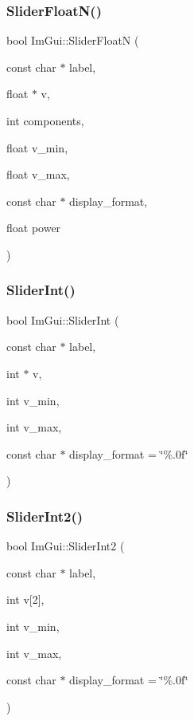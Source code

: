 \hypertarget{namespace_im_gui_a3ffffbdfe59f18a2321dd1cb39dfb6e1}{}\label{namespace_im_gui_a3ffffbdfe59f18a2321dd1cb39dfb6e1} 
\subsubsection{\texorpdfstring{Slider\+Float\+N()}{SliderFloatN()}}
{\footnotesize\ttfamily bool Im\+Gui\+::\+Slider\+FloatN (\begin{DoxyParamCaption}\item[{const char $\ast$}]{label,  }\item[{float $\ast$}]{v,  }\item[{int}]{components,  }\item[{float}]{v\+\_\+min,  }\item[{float}]{v\+\_\+max,  }\item[{const char $\ast$}]{display\+\_\+format,  }\item[{float}]{power }\end{DoxyParamCaption})}

\hypertarget{namespace_im_gui_adfa3869210878bbf2c92c3c9383534f5}{}\label{namespace_im_gui_adfa3869210878bbf2c92c3c9383534f5} 
\subsubsection{\texorpdfstring{Slider\+Int()}{SliderInt()}}
{\footnotesize\ttfamily bool Im\+Gui\+::\+Slider\+Int (\begin{DoxyParamCaption}\item[{const char $\ast$}]{label,  }\item[{int $\ast$}]{v,  }\item[{int}]{v\+\_\+min,  }\item[{int}]{v\+\_\+max,  }\item[{const char $\ast$}]{display\+\_\+format = {\ttfamily \char`\"{}\%.0f\char`\"{}} }\end{DoxyParamCaption})}

\hypertarget{namespace_im_gui_a9dbd0490704d3bb4be10fdebe21d402d}{}\label{namespace_im_gui_a9dbd0490704d3bb4be10fdebe21d402d} 
\subsubsection{\texorpdfstring{Slider\+Int2()}{SliderInt2()}}
{\footnotesize\ttfamily bool Im\+Gui\+::\+Slider\+Int2 (\begin{DoxyParamCaption}\item[{const char $\ast$}]{label,  }\item[{int}]{v\mbox{[}2\mbox{]},  }\item[{int}]{v\+\_\+min,  }\item[{int}]{v\+\_\+max,  }\item[{const char $\ast$}]{display\+\_\+format = {\ttfamily \char`\"{}\%.0f\char`\"{}} }\end{DoxyParamCaption})}

